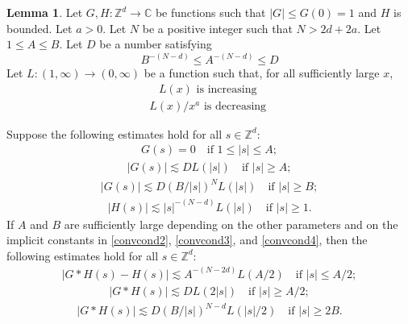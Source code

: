 \documentclass{amsart}
\numberwithin{equation}{section}
\theoremstyle{definition}
\newtheorem{lemma}[theorem]{Lemma}
\theoremstyle{definition}
\def\CC{\mathbb{C}}
\def\ZZ{\mathbb{Z}}
\begin{document}
\begin{lemma}\label{convstab lemma}
Let $G,H:\ZZ^d \to \CC$ be functions such that $|G| \leq G(0)=1$ and $H$ is bounded.
Let $a > 0$. Let $N$ be a positive integer such that 
$N>2d+2a$. Let $1 \leq A \leq B$. 
Let $D$ be a number satisfying 
\begin{equation}\label{Dcond}
B^{-(N - d)} \leq A^{-(N-d)} \leq D
\end{equation} 
Let $L: (1,\infty) \to (0,\infty)$ be a function such that, for all sufficiently large $x$, 
\begin{align}\label{Mcond6}
\text{$L(x)$ is increasing 
}
\end{align}
%
\begin{align}\label{Mcond2} 
\text{$L(x)/x^a$ is decreasing } 
\end{align}


Suppose the following estimates hold for all $s \in \ZZ^d$: 
\begin{align}
\label{convcond1} 
G(s) = 0 \quad \text{if } 1 \leq |s| \leq A; 
\end{align}
\begin{align}
\label{convcond2}
|G(s)| \lesssim D L(|s|) \quad \text{if } |s| \geq A;  
\end{align}
\begin{align}
\label{convcond3}
|G(s)| \lesssim D (B / |s|)^N L(|s|)  \quad \text{if } |s| \geq B;  
\end{align}
\begin{align}
\label{convcond4}
|H(s)| \lesssim |s|^{-(N-d)} L(|s|)  \quad \text{if } |s| \geq 1. 
\end{align}
%
If $A$ and $B$ 
are sufficiently large 
depending 
on 
the other parameters  
and on the implicit constants in \eqref{convcond2}, \eqref{convcond3}, and \eqref{convcond4}, then the following estimates hold for all $s \in \ZZ^d$:
%
\begin{align}\label{convlemmares1}
|G \ast H(s) - H(s)| 
\lesssim 
A^{-(N-2d)} L(A/2)
\quad \text{if } |s| \leq A/2; 
\end{align}
\begin{align}\label{convlemmares2}
|G \ast H(s)| %
\lesssim 
D 
L(2|s|)
\quad \text{if } |s| \geq A/2 ; 
\end{align}
\begin{align}\label{convlemmares3}
|G \ast H(s)| 
\lesssim 
D (B/|s|)^{N-d} %
L(|s|/2)
\quad \text{if } |s| \geq 2 B. 
\end{align}
\end{lemma}
\end{document}
